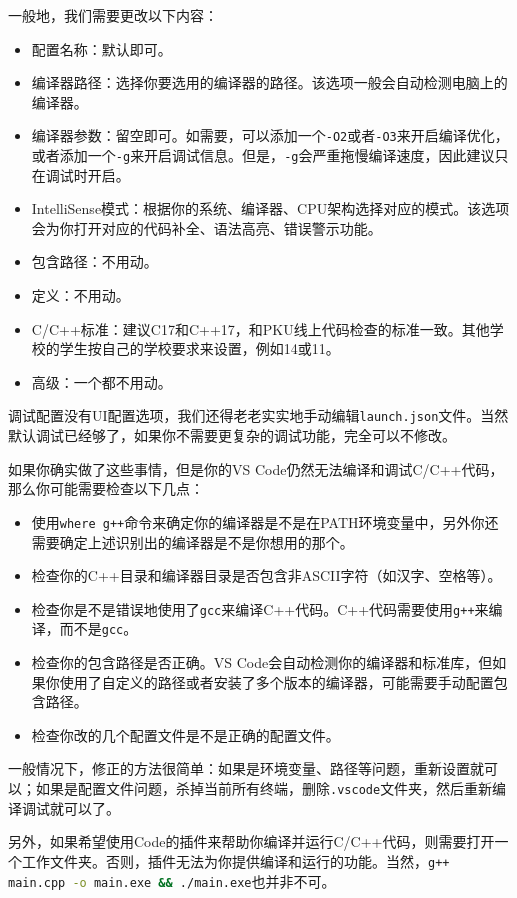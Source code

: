 \documentclass[../main.tex]{subfiles}
\begin{document}
一般地，我们需要更改以下内容：
\begin{itemize}
  \item 配置名称：默认即可。
  \item 编译器路径：选择你要选用的编译器的路径。该选项一般会自动检测电脑上的编译器。
  \item 编译器参数：留空即可。如需要，可以添加一个\texttt{-O2}或者\texttt{-O3}来开启编译优化，或者添加一个\texttt{-g}来开启调试信息。但是，\texttt{-g}会严重拖慢编译速度，因此建议只在调试时开启。
  \item IntelliSense模式：根据你的系统、编译器、CPU架构选择对应的模式。该选项会为你打开对应的代码补全、语法高亮、错误警示功能。
  \item 包含路径：不用动。
  \item 定义：不用动。
  \item C/C++标准：建议C17和C++17，和PKU线上代码检查的标准一致。其他学校的学生按自己的学校要求来设置，例如14或11。
  \item 高级：一个都不用动。
\end{itemize}

调试配置没有UI配置选项，我们还得老老实实地手动编辑\texttt{launch.json}文件。当然默认调试已经够了，如果你不需要更复杂的调试功能，完全可以不修改。

如果你确实做了这些事情，但是你的VS Code仍然无法编译和调试C/C++代码，那么你可能需要检查以下几点：
\begin{itemize}
  \item 使用\texttt{where g++}命令来确定你的编译器是不是在PATH环境变量中，另外你还需要确定上述识别出的编译器是不是你想用的那个。
  \item 检查你的C++目录和编译器目录是否包含非ASCII字符（如汉字、空格等）。
  \item 检查你是不是错误地使用了\texttt{gcc}来编译C++代码。C++代码需要使用\texttt{g++}来编译，而不是\texttt{gcc}。
  \item 检查你的包含路径是否正确。VS Code会自动检测你的编译器和标准库，但如果你使用了自定义的路径或者安装了多个版本的编译器，可能需要手动配置包含路径。
  \item 检查你改的几个配置文件是不是正确的配置文件。
\end{itemize}
一般情况下，修正的方法很简单：如果是环境变量、路径等问题，重新设置就可以；如果是配置文件问题，杀掉当前所有终端，删除\texttt{.vscode}文件夹，然后重新编译调试就可以了。

另外，如果希望使用Code的插件来帮助你编译并运行C/C++代码，则需要打开一个工作文件夹。否则，插件无法为你提供编译和运行的功能。当然，\lstinline[language=bash]|g++ main.cpp -o main.exe && ./main.exe|也并非不可。
\end{document}
